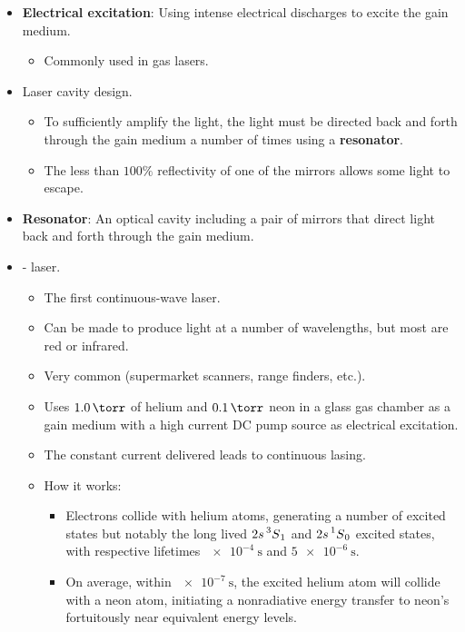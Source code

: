 \documentclass[../notes.tex]{subfiles}
\begin{document}
\begin{itemize}
\begin{itemize}
    \end{itemize}
    \item \textbf{Electrical excitation}: Using intense electrical discharges to excite the gain medium.
    \begin{itemize}
        \item Commonly used in gas lasers.
    \end{itemize}
    \item Laser cavity design.
    \begin{itemize}
        \item To sufficiently amplify the light, the light must be directed back and forth through the gain medium a number of times using a \textbf{resonator}.
        \item The less than $100\%$ reflectivity of one of the mirrors allows some light to escape.
    \end{itemize}
    \item \textbf{Resonator}: An optical cavity including a pair of mirrors that direct light back and forth through the gain medium.
    \item {}- laser.
    \begin{itemize}
        \item The first continuous-wave laser.
        \item Can be made to produce light at a number of wavelengths, but most are red or infrared.
        \item Very common (supermarket scanners, range finders, etc.).
        \item Uses $\SI{1.0}{\torr}$ of helium and $\SI{0.1}{\torr}$ neon in a glass gas chamber as a gain medium with a high current DC pump source as electrical excitation.
        \item The constant current delivered leads to continuous lasing.
        \item How it works:
        \begin{itemize}
            \item Electrons collide with helium atoms, generating a number of excited states but notably the long lived $2s\prescript{3}{}{S}_1$ and $2s\prescript{1}{}{S}_0$ excited states, with respective lifetimes $\SI{e-4}{\second}$ and $\SI{5e-6}{\second}$.
            \item On average, within $\SI{e-7}{\second}$, the excited helium atom will collide with a neon atom, initiating a nonradiative energy transfer to neon's fortuitously near equivalent energy levels.
            \begin{gather*}

\end{gather*}
\end{itemize}
\end{itemize}
\end{itemize}
\end{document}
